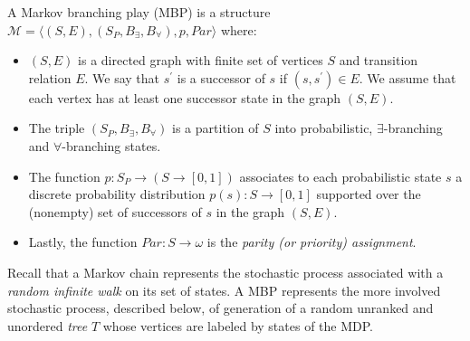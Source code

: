 \begin{definition}
A Markov branching play (MBP) is a structure $\mathcal{M}\!=\!\langle (S,E), (S_{P}, B_\exists,B_\forall), p , Par \rangle$ where:
\begin{itemize}
\item  $(S,E)$ is a directed graph with finite set of vertices $S$ and transition relation $E$. We say that $s^\prime$ is a successor of $s$ if $(s,s^\prime)\!\in\! E$. We assume that each vertex has at least one successor state in the graph  $(S,E)$. 
\item The triple $(S_{P},B_\exists,B_\forall)$ is a partition of $S$ into probabilistic, $\exists$-branching and $\forall$-branching states.
\item The function $p\! :\! S_{P}\!\rightarrow\! (S\rightarrow[0,1])$ associates to each probabilistic state $s$ a discrete probability distribution $p(s):S\rightarrow[0,1]$ supported over the (nonempty) set of successors of $s$ in the graph $(S,E)$. 
\item Lastly, the function $Par\!:\! S\rightarrow\omega$ is the \emph{parity (or priority) assignment}. 
\end{itemize}\end{definition}



\begin{comment}
In what follows we identify Markov chains with MBP's without $\exists$--branching nor $\forall$--branching states, i.e., such that $B_\exists\!=\!B_\forall\!=\!\emptyset$.

As usual, a Markov chain $\mathcal{M}$ represents the stochastic process associated with a \emph{random infinite walk} on it's set of states, i.e., an infinite sequence of states randomly generated in accordance with the probability transition function $p$. 
\end{comment}

Recall that a Markov chain represents the stochastic process associated with a \emph{random infinite walk} on its set of states. A MBP represents the more involved stochastic process, described below, of generation of a random unranked and unordered \emph{tree} $T$ whose vertices are labeled by states of the MDP. 

